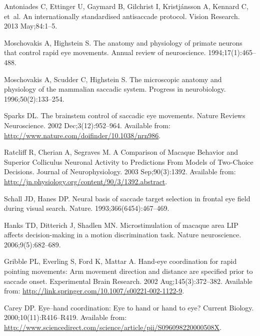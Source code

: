 \documentclass[10pt,letterpaper]{article}
\begin{document}
\begin{thebibliography}{10}
Antoniades C, Ettinger U, Gaymard B, Gilchrist I, Kristjánsson A, Kennard C,
  et~al.
\newblock An internationally standardised antisaccade protocol.
\newblock Vision Research. 2013 May;84:1--5.

Moschovakis A, Highstein S.
\newblock The anatomy and physiology of primate neurons that control rapid eye
  movements.
\newblock Annual review of neuroscience. 1994;17(1):465--488.

Moschovakis A, Scudder C, Highstein S.
\newblock The microscopic anatomy and physiology of the mammalian saccadic
  system.
\newblock Progress in neurobiology. 1996;50(2):133--254.

Sparks DL.
\newblock The brainstem control of saccadic eye movements.
\newblock Nature Reviews Neuroscience. 2002 Dec;3(12):952--964.
\newblock Available from: \url{http://www.nature.com/doifinder/10.1038/nrn986}.

Ratcliff R, Cherian A, Segraves M.
\newblock A {Comparison} of {Macaque} {Behavior} and {Superior} {Colliculus}
  {Neuronal} {Activity} to {Predictions} {From} {Models} of {Two}-{Choice}
  {Decisions}.
\newblock Journal of Neurophysiology. 2003 Sep;90(3):1392.
\newblock Available from:
  \url{http://jn.physiology.org/content/90/3/1392.abstract}.

Schall JD, Hanes DP.
\newblock Neural basis of saccade target selection in frontal eye field during
  visual search.
\newblock Nature. 1993;366(6454):467--469.

Hanks TD, Ditterich J, Shadlen MN.
\newblock Microstimulation of macaque area {LIP} affects decision-making in a
  motion discrimination task.
\newblock Nature neuroscience. 2006;9(5):682--689.

Gribble PL, Everling S, Ford K, Mattar A.
\newblock Hand-eye coordination for rapid pointing movements: {Arm} movement
  direction and distance are specified prior to saccade onset.
\newblock Experimental Brain Research. 2002 Aug;145(3):372--382.
\newblock Available from:
  \url{http://link.springer.com/10.1007/s00221-002-1122-9}.

Carey DP.
\newblock Eye–hand coordination: {Eye} to hand or hand to eye?
\newblock Current Biology. 2000;10(11):R416--R419.
\newblock Available from:
  \url{http://www.sciencedirect.com/science/article/pii/S096098220000508X}.


\end{thebibliography}
\end{document}
